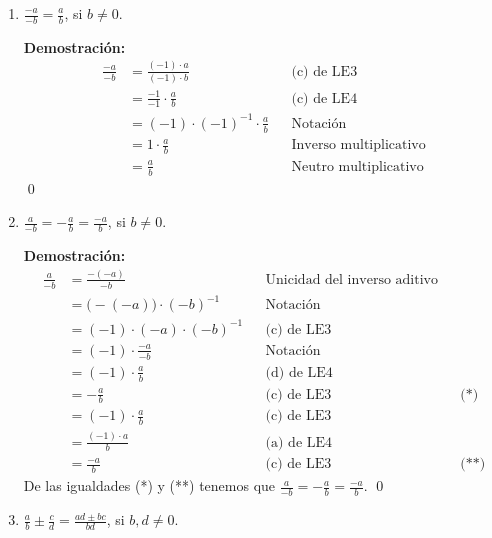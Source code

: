 \documentclass[11pt]{article}
\begin{document}
\begin{enumerate}[label=\alph*)]
    \item $\frac{-a}{-b}=\frac{a}{b}$, si $b\neq 0$.
    
    \textbf{Demostración:} \begin{align*}
    \frac{-a}{-b} &= \frac{(-1)\cdot a}{(-1)\cdot b} && \text{(c) de LE3}\\
    &=\frac{-1}{-1} \cdot \frac{a}{b} && \text{(c) de LE4}\\
    &= (-1)\cdot (-1)^{-1}\cdot \frac{a}{b} && \text{Notación}\\
    &= 1\cdot \frac{a}{b} && \text{Inverso multiplicativo}\\
    &= \frac{a}{b} && \text{Neutro multiplicativo}
    \end{align*} \qed

\pagebreak

    \item $\frac{a}{-b} = -\frac{a}{b}=\frac{-a}{b}$, si $b\neq 0$.
    
    \textbf{Demostración:} \begin{align*}
        \frac{a}{-b} &= \frac{-(-a)}{-b} && \text{Unicidad del inverso aditivo}\\
        &= \bigl(-(-a)\bigr) \cdot (-b)^{-1} && \text{Notación}\\
        &=(-1)\cdot (-a) \cdot (-b)^{-1} && \text{(c) de LE3}\\
        &=(-1) \cdot \frac{-a}{-b} && \text{Notación}\\
        &= (-1) \cdot \frac{a}{b} && \text{(d) de LE4}\\
        &= -\frac{a}{b} && \text{(c) de LE3} && \text{(*)}\\
        &= (-1) \cdot \frac{a}{b} && \text{(c) de LE3}\\
        &= \frac{(-1)\cdot a}{b} && \text{(a) de LE4}\\
        &= \frac{-a}{b} && \text{(c) de LE3} && \text{(**)}
    \end{align*} De las igualdades (*) y (**) tenemos que $\frac{a}{-b} = -\frac{a}{b}=\frac{-a}{b}$. \qed
    
    \item $\frac{a}{b} \pm \frac{c}{d} = \frac{ad \pm bc}{bd} $, si $b, d \neq 0$.
    

\end{enumerate}
\end{document}
